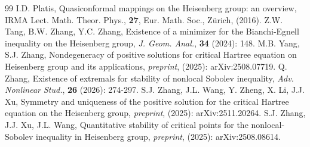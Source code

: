 \documentclass[10pt,a4paper]{amsart}
\begin{document}
\begin{thebibliography}{99}
 I.D. Platis, Quasiconformal mappings on the Heisenberg group: an overview, IRMA Lect. Math. Theor. Phys., {\bf 27}, Eur. Math. Soc., Z\"{u}rich, (2016).
 Z.W. Tang, B.W. Zhang, Y.C. Zhang, Existence of a minimizer for the Bianchi-Egnell inequality on the Heisenberg group, {\em J. Geom. Anal.}, {\bf 34} (2024): 148.
 M.B. Yang, S.J. Zhang, Nondegeneracy of positive solutions for critical Hartree equation on Heisenberg group and its applications, {\em preprint}, (2025): arXiv:2508.07719.
 Q. Zhang, Existence of extremals for stability of nonlocal Sobolev inequality, {\em Adv. Nonlinear Stud.}, {\bf 26} (2026): 274-297.
 S.J. Zhang, J.L. Wang, Y. Zheng, X. Li, J.J. Xu, Symmetry and uniqueness of the positive solution for the critical Hartree equation on the Heisenberg group, {\em preprint}, (2025): arXiv:2511.20264.
 S.J. Zhang, J.J. Xu, J.L. Wang, Quantitative stability of critical points for the nonlocal-Sobolev inequality in Heisenberg group, {\em preprint}, (2025): arXiv:2508.08614.
\end{thebibliography}
\end{document}

